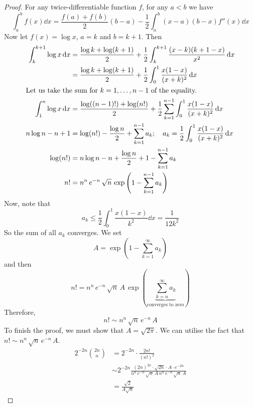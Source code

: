\documentclass{article}
\begin{document}
\begin{proof}
    For any twice-differentiable function $f$, for any $a < b$ we have
    \[ \int_a^b f(x) \dd{x} = \frac{f(a) + f(b)}{2} (b - a) - \frac{1}{2}\int_a^b (x-a)(b-x)f''(x)\dd{x} \]
    Now let $f(x) = \log x$, $a=k$ and $b=k+1$. Then
    \begin{align*}
        \int_k^{k+1} \log x \dd{x} & = \frac{\log k + \log(k+1)}{2} + \frac{1}{2}\int_k^{k+1} \frac{(x-k)(k+1-x)}{x^2}\dd{x}                            \\
                                   & = \frac{\log k + \log(k+1)}{2} + \frac{1}{2}\int_0^1 \frac{x(1-x)}{(x+k)^2}\dd{x}                                  \\
        \intertext{Let us take the sum for $k=1, \dots, n-1$ of the equality.}
        \int_1^n \log x \dd{x}     & = \frac{\log ((n-1)!) + \log(n!)}{2} + \frac{1}{2}\sum_{k=1}^{n-1}\int_0^1 \frac{x(1-x)}{(x+k)^2}\dd{x}            \\
        n\log n - n + 1            & = \log (n!) - \frac{\log n}{2} + \sum_{k=1}^{n-1} a_k;\quad a_k = \frac{1}{2}\int_0^1 \frac{x(1-x)}{(x+k)^2}\dd{x} \\
        \log (n!)                  & = n \log n - n + \frac{\log n}{2} + 1 - \sum_{k=1}^{n-1} a_k                                                       \\
        n!                         & = n^n \, e^{-n} \, \sqrt n \, \exp\left( 1 - \sum_{k=1}^{n-1} a_k \right)
    \end{align*}
    Now, note that
    \[ a_k \leq \frac{1}{2}\int_0^1 \frac{x(1-x)}{k^2}\dd{x} = \frac{1}{12k^2} \]
    So the sum of all $a_k$ converges. We set
    \[ A = \exp\left( 1 - \sum_{k=1}^\infty a_k \right) \]
    and then
    \[ n! = n^n \, e^{-n} \, \sqrt n \, A \, \exp\left( \underbrace{\sum_{k=n}^\infty a_k}_{\text{converges to zero}} \right) \]
    Therefore,
    \[ n! \sim n^n\, \sqrt{n}\, e^{-n}\, A \]
    To finish the proof, we must show that $A = \sqrt{2 \pi}$. We can utilise the fact that $n! \sim n^n\, \sqrt{n}\, e^{-n}\, A$.
    \begin{align*}
        2^{-2n} \binom{2n}{n} & = 2^{-2n} \cdot \frac{2n!}{(n!)^2}                                                                                           \\
                              & \sim 2^{-2n} \frac{(2n)^{2n} \cdot \sqrt{2n} \cdot A \cdot e^{-2n}}{n^n\, e^{-n}\, \sqrt n\, A\, n^n\, e^{-n}\, \sqrt n\, A} \\
                              & = \frac{\sqrt{2}}{A\sqrt{n}}

\end{align*}
\end{proof}
\end{document}

